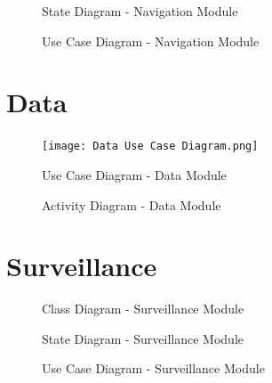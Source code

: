 \documentclass[english]{article}
\begin{document}
        \begin{figure}[H]
            \centering	            \centerline{}
            \caption{State Diagram - Navigation Module}
        \end{figure} 
          
        \begin{figure}[H]
            \centering	            \centerline{}
            \caption{Use Case Diagram - Navigation Module}
        \end{figure}
            
    \section{Data}
        \begin{figure}[H]
            \centering	            \centerline{\texttt{[image: Data Use Case Diagram.png]}}
            \caption{Use Case Diagram - Data Module}
        \end{figure} 
        
        \begin{figure}[H]
            \centering	            \centerline{}
            \caption{Activity Diagram - Data Module}
        \end{figure} 
        
    \section{Surveillance}    
        \begin{figure}[H]
            \centering	            \centerline{}
            \caption{Class Diagram - Surveillance Module}
        \end{figure}
        
        \begin{figure}[H]
            \centering	            \centerline{}
            \caption{State Diagram - Surveillance Module}
        \end{figure}
        
        \begin{figure}[H]
            \centering	            \centerline{}
            \caption{Use Case Diagram - Surveillance Module}
        \end{figure}
        
	
\end{document}
